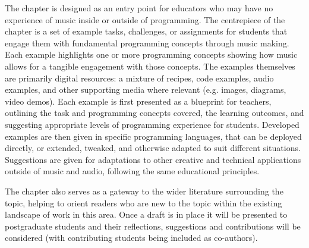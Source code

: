 The chapter is designed as an entry point for educators who may have no experience of music inside or outside of programming. The centrepiece of the chapter is a set of example tasks, challenges, or assignments for students that engage them with fundamental programming concepts through music making. Each example highlights one or more programming concepts showing how music allows for a tangible engagement with those concepts. The examples themselves are primarily digital resources: a mixture of recipes, code examples, audio examples, and other supporting media where relevant (e.g. images, diagrams, video demos). Each example is first presented as a blueprint for teachers, outlining the task and programming concepts covered, the learning outcomes, and suggesting appropriate levels of programming experience for students. Developed examples are then given in specific programming languages, that can be deployed directly, or extended, tweaked, and otherwise adapted to suit different situations. Suggestions are given for adaptations to other creative and technical applications outside of music and audio, following the same educational principles.

The chapter also serves as a gateway to the wider literature surrounding the topic, helping to orient readers who are new to the topic within the existing landscape of work in this area. Once a draft is in place it will be presented to postgraduate students and their reflections, suggestions and contributions will be considered (with contributing students being included as co-authors).
